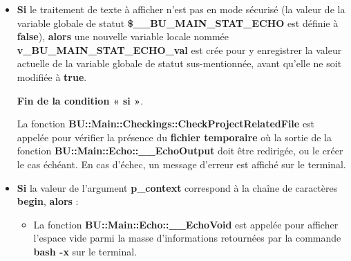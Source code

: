 \documentclass[a4paper,10pt]{article}
\begin{document}
\begin{itemize}
    \item
    {
        \begin{justify}
            \textbf{\color{cond}Si} le traitement de texte à afficher n'est pas en mode sécurisé (la valeur de la variable globale de statut \textbf{\color{vars}\$\_\_BU\_MAIN\_STAT\_ECHO} est définie à \textbf{false}), \textbf{\color{cond}alors} une nouvelle variable locale nommée \textbf{\color{vars}v\_BU\_MAIN\_STAT\_ECHO\_val} est crée pour y enregistrer la valeur actuelle de la variable globale de statut sus-mentionnée, avant qu'elle ne soit modifiée à \textbf{true}.
        \end{justify}

        \setlength{\parskip}{1em}

        \begin{justify}
            \textbf{\color{cond}Fin de la condition « si »}.
        \end{justify}
    }

    \begin{justify}\setlength{\parskip}{2em}
        La fonction \textbf{\color{func}BU::Main::Checkings::CheckProjectRelatedFile} est appelée pour vérifier la présence du \textbf{\color{path}fichier temporaire} où la sortie de la fonction \textbf{\color{func}BU::Main::Echo::\_\_EchoOutput} doit être redirigée, ou le créer le cas échéant. En cas d'échec, un message d'erreur est affiché sur le terminal.
    \end{justify}

    \item
    {
        \setlength{\parskip}{2em}

        \begin{justify}
            \textbf{\color{cond}Si} la valeur de l'argument \textbf{\color{vars}p\_context} correspond à la chaîne de caractères \textbf{begin}, \textbf{\color{cond}alors} :
        \end{justify}

        \setlength{\parskip}{1em}

        \begin{itemize}
            \item
            {
                \begin{justify}
                    La fonction \textbf{\color{func}BU::Main::Echo::\_\_EchoVoid} est appelée pour afficher l'espace vide parmi la masse d'informations retournées par la commande \textbf{\color{cmds}bash -x} sur le terminal.
                \end{justify}
            }


\end{itemize}}
\end{itemize}
\end{document}
